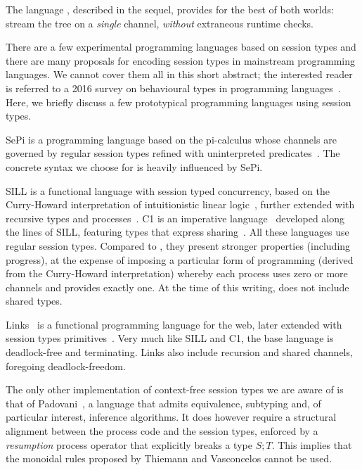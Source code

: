 The language \freest, described in the sequel, provides for the best
of both worlds: stream the tree on a \emph{single} channel,
\emph{without} extraneous runtime checks.


There are a few experimental programming languages based on session
types and there are many proposals for encoding session types in
mainstream programming languages. We cannot cover them all in
this short abstract; the interested reader is referred to a 2016
survey on behavioural types in programming
languages~\cite{DBLP:journals/ftpl/AnconaBB0CDGGGH16}.  Here, we briefly
discuss a few prototypical programming languages using session types.

SePi is a programming language based on the pi-calculus whose channels
are governed by regular session types refined with uninterpreted
predicates~\cite{DBLP:conf/sefm/FrancoV13}. The concrete syntax we
choose for \freest{} is heavily influenced by SePi.

SILL is a functional language with session typed concurrency, based on
the Curry-Howard interpretation of intuitionistic linear
logic~\cite{DBLP:conf/concur/CairesP10}, further extended with
recursive types and
processes~\cite{Toninho:phd,DBLP:conf/esop/ToninhoCP13}.
%
C1 is an imperative language~\cite{Pfenning:C1} developed along the
lines of SILL, featuring types that express
sharing~\cite{DBLP:journals/pacmpl/BalzerP17}.
%
All these languages use regular session types. Compared to \freest,
they present stronger properties (including progress), at the expense
of imposing a particular form of programming (derived from the
Curry-Howard interpretation) whereby each process uses zero or more
channels and provides exactly one. At the time of this writing,
\freest{} does not include shared types.

Links~\cite{DBLP:conf/fmco/CooperLWY06} is a functional programming
language for the web, later extended with session types
primitives~\cite{Lindley.Morris_Lightweight.functional.session.types}. Very
much like SILL and C1, the base language is deadlock-free and
terminating. Links also include recursion and shared channels,
foregoing deadlock-freedom.

The only other implementation of context-free session types we are
aware of is that of Padovani~\cite{DBLP:conf/esop/Padovani17}, a
language that admits equivalence, subtyping and, of particular
interest, inference algorithms. It does however require a structural
alignment between the process code and the session types, enforced by
a \emph{resumption} process operator that explicitly breaks a type
$S;T$. This implies that the monoidal rules proposed by Thiemann and
Vasconcelos cannot be used.

